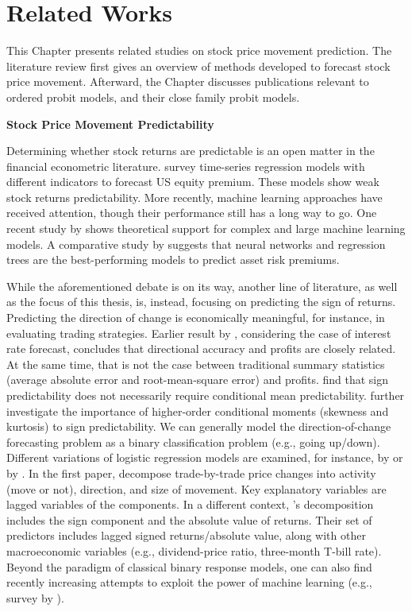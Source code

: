 \chapter{Related Works}\label{chap:relatedwork}

This Chapter presents related studies on stock price movement prediction. The literature review first gives an overview of methods developed to forecast stock price movement. Afterward, the Chapter discusses publications relevant to ordered probit models, and their close family probit models.


\vspace{5mm}

{\noindent\bfseries Stock Price Movement Predictability}

Determining whether stock returns are predictable is an open matter in the financial econometric literature. \citet{rapach_forecasting_2013} survey time-series regression models with different indicators to forecast US equity premium. These models show weak stock returns predictability. More recently, machine learning approaches have received attention, though their performance still has a long way to go. One recent study by \citet{kelly_virtue_2024} shows theoretical support for complex and large machine learning models. A comparative study by \citet{gu_empirical_2020} suggests that neural networks and regression trees are the best-performing models to predict asset risk premiums. 

While the aforementioned debate is on its way, another line of literature, as well as the focus of this thesis, is, instead, focusing on predicting the sign of returns. Predicting the direction of change is economically meaningful, for instance, in evaluating trading strategies. Earlier result by \citet{leichttanner1991}, considering the case of interest rate forecast, concludes that directional accuracy and profits are closely related. At the same time, that is not the case between traditional summary statistics (average absolute error and root-mean-square error) and profits. \citet{christoffersen_financial_2006} find that sign predictability does not necessarily require conditional mean predictability. \citet{christoffersenetal2007} further investigate the importance of higher-order conditional moments (skewness and kurtosis) to sign predictability. We can generally model the direction-of-change forecasting problem as a binary classification problem (e.g., going up/down). Different variations of logistic regression models are examined, for instance, by \citet{rydbergshephard2003} or by \citet{anatolyevgospodinov2010}. In the first paper, \citet{rydbergshephard2003} decompose trade-by-trade price changes into activity (move or not), direction, and size of movement. Key explanatory variables are lagged variables of the components. In a different context, \citet{anatolyevgospodinov2010}’s decomposition includes the sign component and the absolute value of returns. Their set of predictors includes lagged signed returns/absolute value, along with other macroeconomic variables (e.g., dividend-price ratio, three-month T-bill rate). Beyond the paradigm of classical binary response models, one can also find recently increasing attempts to exploit the power of machine learning (e.g., survey by \citet{bustos_stock_2020}). 


